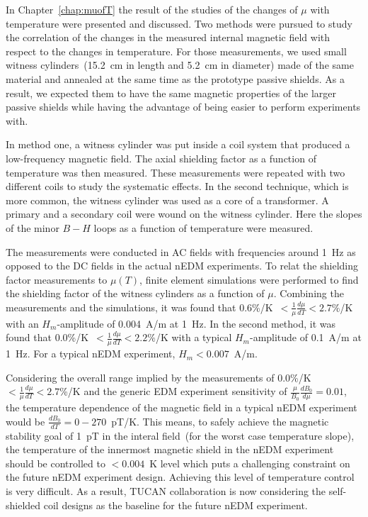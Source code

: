 
In Chapter~\ref{chap:muofT} the result of the studies of the changes
of $\mu$ with temperature were presented and discussed. Two methods
were pursued to study the correlation of the changes in the measured
internal magnetic field with respect to the changes in temperature.
For those measurements, we used small witness cylinders~(15.2~cm in
length and 5.2~cm in diameter) made of the same material and annealed
at the same time as the prototype passive shields. As a result, we
expected them to have the same magnetic properties of the larger
passive shields while having the advantage of being easier to perform
experiments with.


In method one, a witness cylinder was put inside a coil system that
produced a low-frequency magnetic field. The axial shielding factor as
a function of temperature was then measured. These measurements were
repeated with two different coils to study the systematic effects. In
the second technique, which is more common, the witness cylinder was
used as a core of a transformer. A primary and a secondary coil were
wound on the witness cylinder. Here the slopes of the minor $B-H$
loops as a function of temperature were measured.

The measurements were conducted in AC fields with frequencies around
1~Hz as opposed to the DC fields in the actual nEDM experiments. To
relat the shielding factor measurements to $\mu(T)$, finite element
simulations were performed to find the shielding factor of the witness
cylinders as a function of $\mu$. Combining the measurements and the
simulations, it was found that
0.6\%/K~$<\frac{1}{\mu}\frac{d\mu}{dT}<2.7\%$/K with an
$H_m$-amplitude of 0.004~A/m at 1~Hz. In the second method, it was
found that 0.0\%/K~$<\frac{1}{\mu}\frac{d\mu}{dT}<2.2\%$/K with a
typical $H_m$-amplitude of 0.1~A/m at 1~Hz. For a typical nEDM
experiment, $H_m < 0.007$~A/m.

Considering the overall range implied by the measurements of
0.0\%/K~$<\frac{1}{\mu}\frac{d\mu}{dT}<2.7$\%/K and the generic EDM
experiment sensitivity of $\frac{\mu}{B_0}\frac{dB_0}{d\mu}=0.01$, the
temperature dependence of the magnetic field in a typical nEDM
experiment would be $\frac{dB_0}{dT}=0-270$~pT/K. This means, to
safely achieve the magnetic stability goal of 1~pT in the interal
field~(for the worst case temperature slope), the temperature of the
innermost magnetic shield in the nEDM experiment should be controlled
to $<0.004$~K level which puts a challenging constraint on the future
nEDM experiment design. Achieving this level of temperature control is
very difficult. As a result, TUCAN collaboration is now considering
the self-shielded coil designs as the baseline for the future nEDM
experiment.

